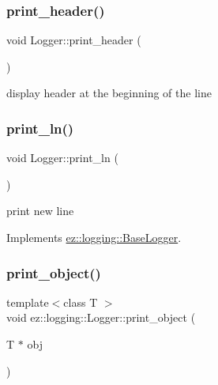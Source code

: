 \subsubsection{\texorpdfstring{print\+\_\+header()}{print\_header()}}
{\footnotesize\ttfamily void Logger\+::print\+\_\+header (\begin{DoxyParamCaption}{ }\end{DoxyParamCaption})\hspace{0.3cm}{\ttfamily [protected]}}

display header at the beginning of the line \mbox{\label{classez_1_1logging_1_1Logger_ab8e5b19223eca4b3af5ff7df2db607b7}} 
\subsubsection{\texorpdfstring{print\+\_\+ln()}{print\_ln()}}
{\footnotesize\ttfamily void Logger\+::print\+\_\+ln (\begin{DoxyParamCaption}{ }\end{DoxyParamCaption})\hspace{0.3cm}{\ttfamily [virtual]}}

print new line 

Implements \hyperlink{classez_1_1logging_1_1BaseLogger_a1cad8cfe8029ecd0360573b3dd4a0543}{ez\+::logging\+::\+Base\+Logger}.

\mbox{\label{classez_1_1logging_1_1Logger_ab81b4be85f103d81e7b25a9cdf0a68e3}} 
\subsubsection{\texorpdfstring{print\+\_\+object()}{print\_object()}}
{\footnotesize\ttfamily template$<$class T $>$ \\
void ez\+::logging\+::\+Logger\+::print\+\_\+object (\begin{DoxyParamCaption}\item[{T $\ast$}]{obj }\end{DoxyParamCaption})\hspace{0.3cm}{\ttfamily [inline]}}

